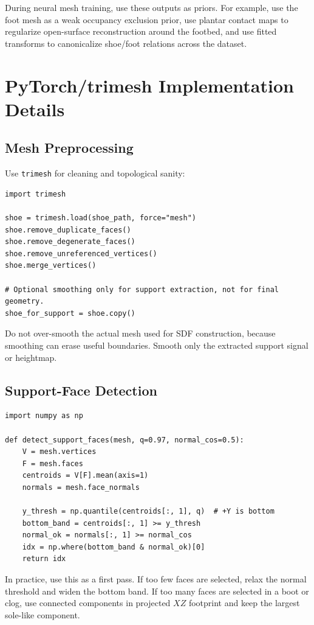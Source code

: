 \documentclass[11pt]{article}
\begin{document}
During neural mesh training, use these outputs as priors. For example, use the foot mesh as a weak occupancy exclusion prior, use plantar contact maps to regularize open-surface reconstruction around the footbed, and use fitted transforms to canonicalize shoe/foot relations across the dataset.

\section{PyTorch/trimesh Implementation Details}

\subsection{Mesh Preprocessing}

Use \texttt{trimesh} for cleaning and topological sanity:

\begin{lstlisting}[style=pythonstyle]
import trimesh

shoe = trimesh.load(shoe_path, force="mesh")
shoe.remove_duplicate_faces()
shoe.remove_degenerate_faces()
shoe.remove_unreferenced_vertices()
shoe.merge_vertices()

# Optional smoothing only for support extraction, not for final geometry.
shoe_for_support = shoe.copy()
\end{lstlisting}

Do not over-smooth the actual mesh used for SDF construction, because smoothing can erase useful boundaries. Smooth only the extracted support signal or heightmap.

\subsection{Support-Face Detection}

\begin{lstlisting}[style=pythonstyle]
import numpy as np

def detect_support_faces(mesh, q=0.97, normal_cos=0.5):
    V = mesh.vertices
    F = mesh.faces
    centroids = V[F].mean(axis=1)
    normals = mesh.face_normals

    y_thresh = np.quantile(centroids[:, 1], q)  # +Y is bottom
    bottom_band = centroids[:, 1] >= y_thresh
    normal_ok = normals[:, 1] >= normal_cos
    idx = np.where(bottom_band & normal_ok)[0]
    return idx
\end{lstlisting}

In practice, use this as a first pass. If too few faces are selected, relax the normal threshold and widen the bottom band. If too many faces are selected in a boot or clog, use connected components in projected $X Z$ footprint and keep the largest sole-like component.
\end{document}
